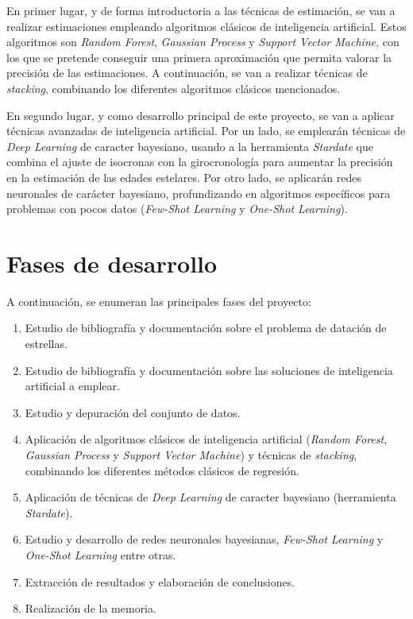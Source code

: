 \documentclass[12pt,oneside,a4paper]{article}
\begin{document}
En primer lugar, y de forma introductoria a las técnicas de estimación, se van a realizar estimaciones empleando algoritmos clásicos de inteligencia artificial. Estos algoritmos son \textit{Random Forest}, \textit{Gaussian Process} y \textit{Support Vector Machine}, con los que se pretende conseguir una primera aproximación que permita valorar la precisión de las estimaciones. A continuación, se van a realizar técnicas de \textit{stacking}, combinando los diferentes algoritmos clásicos mencionados.

En segundo lugar, y como desarrollo principal de este proyecto, se van a aplicar técnicas avanzadas de inteligencia artificial. Por un lado, se emplearán técnicas de \textit{Deep Learning} de caracter bayesiano, usando a la herramienta \textit{Stardate} \cite{Angus2019} que combina el ajuste de isocronas con la girocronología para aumentar la precisión en la estimación de las edades estelares. Por otro lado, se aplicarán redes neuronales de carácter bayesiano, profundizando en algoritmos específicos para problemas con pocos datos (\textit{Few-Shot Learning} y \textit{One-Shot Learning}).

\section{Fases de desarrollo}
A continuación, se enumeran las principales fases del proyecto:

\begin{enumerate}
\item Estudio de bibliografía y documentación sobre el problema de datación de estrellas.
\item Estudio de bibliografía y documentación sobre las soluciones de inteligencia artificial a emplear.
\item Estudio y depuración del conjunto de datos.
\item Aplicación de algoritmos clásicos de inteligencia artificial (\textit{Random Forest}, \textit{Gaussian Process} y \textit{Support Vector Machine}) y técnicas de \textit{stacking}, combinando los diferentes métodos clásicos de regresión.
\item Aplicación de técnicas de \textit{Deep Learning} de caracter bayesiano (herramienta \textit{Stardate}).
\item Estudio y desarrollo de redes neuronales bayesianas, \textit{Few-Shot Learning} y \textit{One-Shot Learning} entre otras.
\item Extracción de resultados y elaboración de conclusiones.
\item Realización de la memoria.
\end{enumerate}

\newpage



\end{document}
